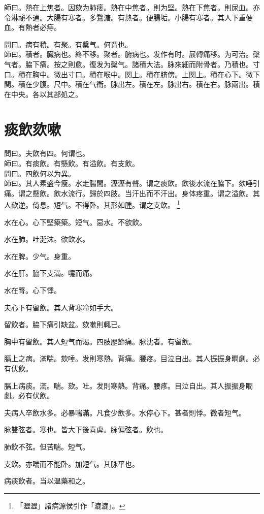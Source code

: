 師曰。熱在上焦者。因欬为肺痿。熱在中焦者。則为堅。熱在下焦者。則尿血。亦令淋祕不通。大腸有寒者。多鶩溏。有熱者。便腸垢。小腸有寒者。其人下重便血。有熱者必痔。

問曰。病有積。有聚。有䅽气。何谓也。\\
師曰。積者。臓病也。終不移。聚者。腑病也。发作有时。展轉痛移。为可治。䅽气者。脇下痛。按之則愈。復发为䅽气。諸積大法。脉來細而附骨者。乃積也。寸口。積在胸中。微出寸口。積在喉中。関上。積在脐傍。上関上。積在心下。微下関。積在少腹。尺中。積在气衝。脉出左。積在左。脉出右。積在右。脉兩出。積在中央。各以其部処之。

\chapter{痰飲欬嗽}

問曰。夫飲有四。何谓也。\\
師曰。有痰飲。有懸飲。有溢飲。有支飲。\\
問曰。四飲何以为異。\\
師曰。其人素盛今瘦。水走腸間。瀝瀝有聲。谓之痰飲。飲後水流在脇下。欬唾引痛。谓之懸飲。飲水流行。歸於四肢。当汗出而不汗出。身体疼重。谓之溢飲。其人欬逆。倚息。短气。不得卧。其形如腫。谓之支飲。
	\footnote{「瀝瀝」諸病源侯引作「漉漉」。}

水在心。心下堅築{\khaaitp 築}。短气。惡水。不欲飲。

水在肺。吐涎沫。欲飲水。

水在脾。少气。身重。

水在肝。脇下支滿。嚏而痛。

水在腎。心下悸。

夫心下有留飲。其人背寒冷如手大。

留飲者。脇下痛引缺盆。欬嗽則輒已。

胸中有留飲。其人短气而渴。四肢歷節痛。脉沈者。有留飲。

膈上之病。滿喘。欬唾。发則寒熱。背痛。腰疼。目泣自出。其人振振身瞤劇。必有伏飲。{\wuben}

膈上病痰。滿。喘。欬。吐。发則寒熱。背痛。腰疼。目泣自出。其人振振身瞤劇。必有伏飲。{\dengben}

夫病人卒飲水多。必暴喘滿。凡食少飲多。水停心下。甚者則悸。微者短气。

脉雙弦者。寒也。皆大下後喜虗。脉偏弦者。飲也。

肺飲不弦。但苦喘。短气。

支飲。亦喘而不能卧。加短气。其脉平也。

病痰飲者。当以温藥和之。

